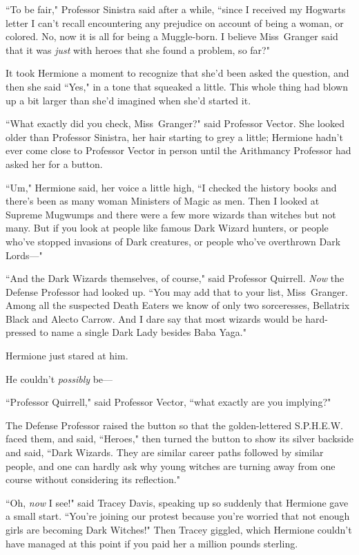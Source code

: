 ``To be fair," Professor Sinistra said after a while, ``since I received my Hogwarts letter I can't recall encountering any prejudice on account of being a woman, or colored. No, now it is all for being a Muggle-born. I believe Miss~Granger said that it was \emph{just} with heroes that she found a problem, so far?"

It took Hermione a moment to recognize that she'd been asked the question, and then she said ``Yes," in a tone that squeaked a little. This whole thing had blown up a bit larger than she'd imagined when she'd started it.

``What exactly did you check, Miss~Granger?" said Professor Vector. She looked older than Professor Sinistra, her hair starting to grey a little; Hermione hadn't ever come close to Professor Vector in person until the Arithmancy Professor had asked her for a button.

``Um," Hermione said, her voice a little high, ``I checked the history books and there's been as many woman Ministers of Magic as men. Then I looked at Supreme Mugwumps and there were a few more wizards than witches but not many. But if you look at people like famous Dark Wizard hunters, or people who've stopped invasions of Dark creatures, or people who've overthrown Dark Lords—"

``And the Dark Wizards themselves, of course," said Professor Quirrell. \emph{Now} the Defense Professor had looked up. ``You may add that to your list, Miss~Granger. Among all the suspected Death Eaters we know of only two sorceresses, Bellatrix Black and Alecto Carrow. And I dare say that most wizards would be hard-pressed to name a single Dark Lady besides Baba Yaga."

Hermione just stared at him.

He couldn't \emph{possibly} be—

``Professor Quirrell," said Professor Vector, ``what exactly are you implying?"

The Defense Professor raised the button so that the golden-lettered S.P.H.E.W. faced them, and said, ``Heroes," then turned the button to show its silver backside and said, ``Dark Wizards. They are similar career paths followed by similar people, and one can hardly ask why young witches are turning away from one course without considering its reflection."

``Oh, \emph{now} I see!" said Tracey Davis, speaking up so suddenly that Hermione gave a small start. ``You're joining our protest because you're worried that not enough girls are becoming Dark Witches!" Then Tracey giggled, which Hermione couldn't have managed at this point if you paid her a million pounds sterling.

